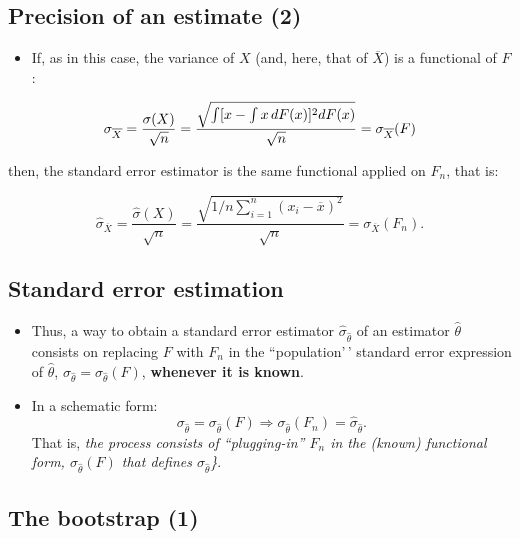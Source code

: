 \documentclass[
  letterpaper,
  DIV=11,
  numbers=noendperiod]{scrartcl}
\providecommand{\tightlist}{%
  \setlength{\itemsep}{0pt}\setlength{\parskip}{0pt}}\usepackage{longtable,booktabs,array}
\begin{document}
\hypertarget{precision-of-an-estimate-2}{%
\subsection{Precision of an estimate
(2)}\label{precision-of-an-estimate-2}}

\begin{itemize}
\tightlist
\item
  If, as in this case, the variance of \(X\) (and, here, that of
  \(\overline{X}\)) is a functional of \(F\):
\end{itemize}

\[
\sigma _{\overline{X}}=\frac{\sigma (X)}{\sqrt{n}}=\frac{\sqrt{\int
[x-\int x\,dF(x)]\sp 2dF(x)}}{\sqrt{n}}=\sigma _{\overline{X}}(F)
\]

then, the standard error estimator is the same functional applied on
\(F_n\), that is:

\[
\hat{\sigma}_{\overline{X}}=\frac{\hat{\sigma}(X)}{\sqrt{n}}=\frac{\sqrt{1/n\sum_{i=1}^n(x_i-\overline{x})^2}}{\sqrt{n}}=\sigma
_{\overline{X}}(F_n).
\]

\hypertarget{standard-error-estimation}{%
\subsection{Standard error estimation}\label{standard-error-estimation}}

\begin{itemize}
\tightlist
\item
  Thus, a way to obtain a standard error estimator
  \(\widehat{\sigma}_{\widehat{\theta}}\) of an estimator
  \(\widehat{\theta}\) consists on replacing \(F\) with \(F_n\) in the
  ``population'\,' standard error expression of \(\hat \theta\),
  \(\displaystyle{\sigma_{\hat \theta}= \sigma_{\hat \theta}(F)}\),
  \textbf{whenever it is known}.
\item
  In a schematic form: \[
  \sigma_{\hat \theta}= \sigma_{\hat \theta}(F) \Longrightarrow
  \sigma_{\hat \theta}(F_n)= \widehat{\sigma}_{\hat \theta}.
  \] That is, \emph{the process consists of ``plugging-in'' \(F_n\) in
  the (known) functional form, \(\sigma_{\hat \theta}(F)\) that defines
  \(\sigma_{\hat \theta}\)\}}.
\end{itemize}

\hypertarget{the-bootstrap-1}{%
\subsection{The bootstrap (1)}\label{the-bootstrap-1}}
\end{document}
